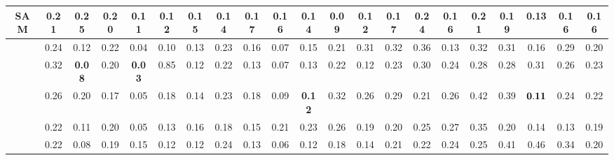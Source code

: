 \begin{table}[ht]
{\begin{tabular}{cccccccc|cccc|cccccccc|c}
\multicolumn{1}{c}{\cellcolor[HTML]{FFFFFF}SAM} &
  0.21 &
  0.25 &
  0.20 &
  0.11 &
  0.12 &
  0.15 &
  \cellcolor[HTML]{9AFF99}\textbf{0.14} &
  0.17 &
  0.16 &
  0.14 &
  0.09 &
  0.12 &
  0.17 &
  0.24 &
  0.16 &
  0.21 &
  0.19 &
  0.13 &
  0.16 &
  \cellcolor[HTML]{FFFFFF}0.16 \\ \hline
\rowcolor[HTML]{FFFFFF} 


\multicolumn{1}{c}{\cellcolor[HTML]{FFFFFF}DeepEns} &
  0.24 &
  0.12 &
  0.22 &
  0.04 &
  0.10 &
  0.13 &
  0.23 &
  0.16 &
  0.07 &
  0.15 &
  0.21 &
  0.31 &
  0.32 &
  0.36 &
  \cellcolor[HTML]{9AFF99}$\mathbf{0.13}$ & 
  0.32 & 
  0.31& 
  0.16 & 
  0.29 &
  \cellcolor[HTML]{FFFFFF}0.20 \\ 
\rowcolor[HTML]{FFFFFF} 
\multicolumn{1}{c}{\cellcolor[HTML]{FFFFFF}{\color[HTML]{000000} BayesTune}} &
  0.32 &
  \cellcolor[HTML]{9AFF99}\textbf{0.08}&
  0.20 &
  \cellcolor[HTML]{9AFF99}\textbf{0.03} &
  0.85 &
  0.12 &
  0.22 &
  0.13 &
  0.07 &
  0.13 &
  0.22 &
  0.12 &
  0.23 &
  0.30 &
  0.24 &
  0.28 &
  0.28 &
  0.31 &
  0.26 &
  \cellcolor[HTML]{FFFFFF}0.23\\ 
   \rowcolor[HTML]{FFFFFF}
   \multicolumn{1}{c}{\cellcolor[HTML]{FFFFFF}{\color[HTML]{000000} SGLD}} &
  0.26 & %
  0.20 & %
  0.17 & %
  0.05& %
  0.18 & %
  0.14 & %
  0.23 & %
  0.18 & %
  0.09 & %
  \cellcolor[HTML]{9AFF99}\textbf{0.12} & %
  0.32 & %
  0.26 & %
  0.29 & %
  0.21 & %
  0.26 & %
  0.42 & %
  0.39 & %
  \cellcolor[HTML]{9AFF99}$\bf{0.11}$ & %
  0.24 & %
  \cellcolor[HTML]{FFFFFF}0.22\\ 
  \rowcolor[HTML]{FFFFFF}
   \cellcolor[HTML]{FFFFFF}{\color[HTML]{000000} 
   
    SADA-JEM} &
   0.22 &
   0.11 &
   0.20 &
   0.05 &
   0.13 &
   0.16 &
   0.18 &
   0.15 &
   0.21 &
   0.23 &
   0.26 &
   0.19 &
   0.20 &
   0.25 &
   0.27 &
   0.35 &
   0.20 &
   0.14 &
   0.13 &
  \cellcolor[HTML]{FFFFFF} 0.19\\ 
  
  \rowcolor[HTML]{FFFFFF}
   \cellcolor[HTML]{FFFFFF}{\color[HTML]{000000} 
   
    SA-BNN} &
   0.22 &
   0.08 &
   0.19 &
   0.15 &
   0.12 &
   0.12 &
   0.24 &
   0.13 &
   0.06 &
   0.12 &
   0.18 &
   0.14 &
   0.21 &
   0.22 &
   0.24 &
   0.25 &
   0.41 &
   0.46 &
   0.34 &
  \cellcolor[HTML]{FFFFFF}0.20\\ 
  

\end{tabular}}
\end{table}
